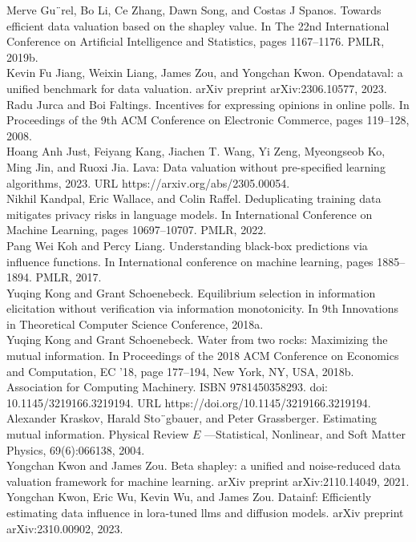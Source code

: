 Merve Gu¨rel, Bo Li, Ce Zhang, Dawn Song, and Costas J Spanos. Towards
efficient data valuation based on the shapley value. In The 22nd
International Conference on Artificial Intelligence and Statistics,
pages 1167--1176. PMLR, 2019b.\\
Kevin Fu Jiang, Weixin Liang, James Zou, and Yongchan Kwon. Opendataval:
a unified benchmark for data valuation. arXiv preprint arXiv:2306.10577,
2023.\\
Radu Jurca and Boi Faltings. Incentives for expressing opinions in
online polls. In Proceedings of the 9th ACM Conference on Electronic
Commerce, pages 119--128, 2008.\\
Hoang Anh Just, Feiyang Kang, Jiachen T. Wang, Yi Zeng, Myeongseob Ko,
Ming Jin, and Ruoxi Jia. Lava: Data valuation without pre-specified
learning algorithms, 2023. URL https://arxiv.org/abs/2305.00054.\\
Nikhil Kandpal, Eric Wallace, and Colin Raffel. Deduplicating training
data mitigates privacy risks in language models. In International
Conference on Machine Learning, pages 10697--10707. PMLR, 2022.\\
Pang Wei Koh and Percy Liang. Understanding black-box predictions via
influence functions. In International conference on machine learning,
pages 1885--1894. PMLR, 2017.\\
Yuqing Kong and Grant Schoenebeck. Equilibrium selection in information
elicitation without verification via information monotonicity. In 9th
Innovations in Theoretical Computer Science Conference, 2018a.\\
Yuqing Kong and Grant Schoenebeck. Water from two rocks: Maximizing the
mutual information. In Proceedings of the 2018 ACM Conference on
Economics and Computation, EC '18, page 177--194, New York, NY, USA,
2018b. Association for Computing Machinery. ISBN 9781450358293. doi:
10.1145/3219166.3219194. URL https://doi.org/10.1145/3219166.3219194.\\
Alexander Kraskov, Harald Sto¨gbauer, and Peter Grassberger. Estimating
mutual information. Physical Review \(E\) ---Statistical, Nonlinear, and
Soft Matter Physics, 69(6):066138, 2004.\\
Yongchan Kwon and James Zou. Beta shapley: a unified and noise-reduced
data valuation framework for machine learning. arXiv preprint
arXiv:2110.14049, 2021.\\
Yongchan Kwon, Eric Wu, Kevin Wu, and James Zou. Datainf: Efficiently
estimating data influence in lora-tuned llms and diffusion models. arXiv
preprint arXiv:2310.00902, 2023.\\
